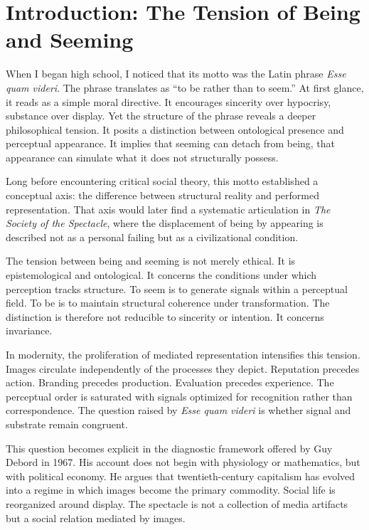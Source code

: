 \documentclass[11pt]{article}
\begin{document}
\newpage

\section{Introduction: The Tension of Being and Seeming}

When I began high school, I noticed that its motto was the Latin phrase \textit{Esse quam videri}. The phrase translates as ``to be rather than to seem.'' At first glance, it reads as a simple moral directive. It encourages sincerity over hypocrisy, substance over display. Yet the structure of the phrase reveals a deeper philosophical tension. It posits a distinction between ontological presence and perceptual appearance. It implies that seeming can detach from being, that appearance can simulate what it does not structurally possess.

Long before encountering critical social theory, this motto established a conceptual axis: the difference between structural reality and performed representation. That axis would later find a systematic articulation in \textit{The Society of the Spectacle}, where the displacement of being by appearing is described not as a personal failing but as a civilizational condition.

The tension between being and seeming is not merely ethical. It is epistemological and ontological. It concerns the conditions under which perception tracks structure. To seem is to generate signals within a perceptual field. To be is to maintain structural coherence under transformation. The distinction is therefore not reducible to sincerity or intention. It concerns invariance.

In modernity, the proliferation of mediated representation intensifies this tension. Images circulate independently of the processes they depict. Reputation precedes action. Branding precedes production. Evaluation precedes experience. The perceptual order is saturated with signals optimized for recognition rather than correspondence. The question raised by \textit{Esse quam videri} is whether signal and substrate remain congruent.

This question becomes explicit in the diagnostic framework offered by Guy Debord in 1967. His account does not begin with physiology or mathematics, but with political economy. He argues that twentieth-century capitalism has evolved into a regime in which images become the primary commodity. Social life is reorganized around display. The spectacle is not a collection of media artifacts but a social relation mediated by images.
\end{document}
